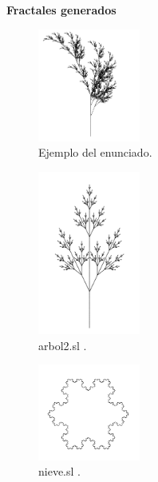 \documentclass{article}
\begin{document}
 \begin{Huge}
	\begin{center}
		\textbf{Fractales generados \\[1cm]}
	\end{center}	 
\end{Huge}


\begin{figure}[hbt!]
	\center
	\includegraphics[width=0.3\textwidth]{img/ejemplo.png}
	\caption{
	\label{fig:my-label} Ejemplo del enunciado. }
\end{figure}


\begin{figure}[hbt!]
	\center
	\includegraphics[width=0.3\textwidth]{img/arbol2.png}
	\caption{
	\label{fig:my-label} arbol2.sl . }
\end{figure}

\begin{figure}[hbt!]
	\center
	\includegraphics[width=0.3\textwidth]{img/nieve.png}
	\caption{
	\label{fig:my-label} nieve.sl . }
\end{figure}
\end{document}
